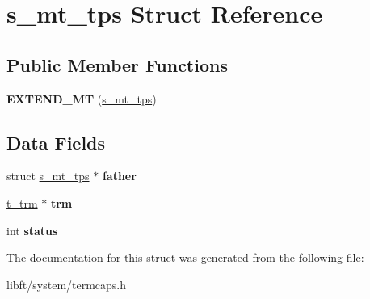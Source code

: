 \hypertarget{structs__mt__tps}{}\section{s\+\_\+mt\+\_\+tps Struct Reference}
\label{structs__mt__tps}
\subsection*{Public Member Functions}
\begin{DoxyCompactItemize}
\item 
\hypertarget{structs__mt__tps_ab1afbad9fa701fa4131564ee0a1ac990}{}{\bfseries E\+X\+T\+E\+N\+D\+\_\+\+M\+T} (\hyperlink{structs__mt__tps}{s\+\_\+mt\+\_\+tps})\label{structs__mt__tps_ab1afbad9fa701fa4131564ee0a1ac990}

\end{DoxyCompactItemize}
\subsection*{Data Fields}
\begin{DoxyCompactItemize}
\item 
\hypertarget{structs__mt__tps_a5925eef65939dbd7eea1d5b7eb80d8da}{}struct \hyperlink{structs__mt__tps}{s\+\_\+mt\+\_\+tps} $\ast$ {\bfseries father}\label{structs__mt__tps_a5925eef65939dbd7eea1d5b7eb80d8da}

\item 
\hypertarget{structs__mt__tps_a429071dba7d6b2c3503542b41723d667}{}\hyperlink{structs__trm}{t\+\_\+trm} $\ast$ {\bfseries trm}\label{structs__mt__tps_a429071dba7d6b2c3503542b41723d667}

\item 
\hypertarget{structs__mt__tps_a6e27f49150e9a14580fb313cc2777e00}{}int {\bfseries status}\label{structs__mt__tps_a6e27f49150e9a14580fb313cc2777e00}

\end{DoxyCompactItemize}


The documentation for this struct was generated from the following file\+:\begin{DoxyCompactItemize}
\item 
libft/system/termcaps.\+h\end{DoxyCompactItemize}
